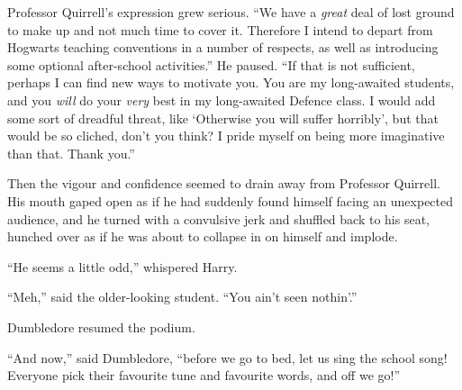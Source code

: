 Professor Quirrell’s expression grew serious. “We have a \emph{great} deal of lost ground to make up and not much time to cover it. Therefore I intend to depart from Hogwarts teaching conventions in a number of respects, as well as introducing some optional after-school activities.” He paused. “If that is not sufficient, perhaps I can find new ways to motivate you. You are my long-awaited students, and you \emph{will} do your \emph{very} best in my long-awaited Defence class. I would add some sort of dreadful threat, like ‘Otherwise you will suffer horribly’, but that would be so cliched, don’t you think? I pride myself on being more imaginative than that. Thank you.”

Then the vigour and confidence seemed to drain away from Professor Quirrell. His mouth gaped open as if he had suddenly found himself facing an unexpected audience, and he turned with a convulsive jerk and shuffled back to his seat, hunched over as if he was about to collapse in on himself and implode.

“He seems a little odd,” whispered Harry.

“Meh,” said the older-looking student. “You ain’t seen nothin’.”

Dumbledore resumed the podium.

“And now,” said Dumbledore, “before we go to bed, let us sing the school song! Everyone pick their favourite tune and favourite words, and off we go!”
